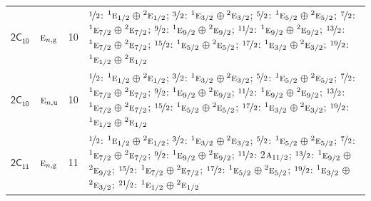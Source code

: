 \documentclass[10pt,a4paper]{article}
\numberwithin{equation}{section}
\newcommand{\grp}[1]{\mathsf{#1}}
\newcommand{\irr}[1]{\text{\normalfont\scshape #1}}
\newcommand{\conjpair}[1]{{}^{#1}}
\newcommand{\ptag}[1]{\mathrm{#1}}
\newlength{\fillwidth}\newlength{\cellwidth}\newlength{\colwidth}
\begin{document}
{\begin{longtable}{@{}llr>{\RaggedRight\arraybackslash}p{\fillwidth}@{}}
\href{2C10.pdf}{$\grp{2C_{10}}$} & $\irr{e}_{n,\ptag{g}}$ & 10 & $\nicefrac{1}{2}$: $\conjpair{1}\irr{e}_{1/2}$${}\oplus{}$$\conjpair{2}\irr{e}_{1/2}$; $\nicefrac{3}{2}$: $\conjpair{1}\irr{e}_{3/2}$${}\oplus{}$$\conjpair{2}\irr{e}_{3/2}$; $\nicefrac{5}{2}$: $\conjpair{1}\irr{e}_{5/2}$${}\oplus{}$$\conjpair{2}\irr{e}_{5/2}$; $\nicefrac{7}{2}$: $\conjpair{1}\irr{e}_{7/2}$${}\oplus{}$$\conjpair{2}\irr{e}_{7/2}$; $\nicefrac{9}{2}$: $\conjpair{1}\irr{e}_{9/2}$${}\oplus{}$$\conjpair{2}\irr{e}_{9/2}$; $\nicefrac{11}{2}$: $\conjpair{1}\irr{e}_{9/2}$${}\oplus{}$$\conjpair{2}\irr{e}_{9/2}$; $\nicefrac{13}{2}$: $\conjpair{1}\irr{e}_{7/2}$${}\oplus{}$$\conjpair{2}\irr{e}_{7/2}$; $\nicefrac{15}{2}$: $\conjpair{1}\irr{e}_{5/2}$${}\oplus{}$$\conjpair{2}\irr{e}_{5/2}$; $\nicefrac{17}{2}$: $\conjpair{1}\irr{e}_{3/2}$${}\oplus{}$$\conjpair{2}\irr{e}_{3/2}$; $\nicefrac{19}{2}$: $\conjpair{1}\irr{e}_{1/2}$${}\oplus{}$$\conjpair{2}\irr{e}_{1/2}$\\
\href{2C10.pdf}{$\grp{2C_{10}}$} & $\irr{e}_{n,\ptag{u}}$ & 10 & $\nicefrac{1}{2}$: $\conjpair{1}\irr{e}_{1/2}$${}\oplus{}$$\conjpair{2}\irr{e}_{1/2}$; $\nicefrac{3}{2}$: $\conjpair{1}\irr{e}_{3/2}$${}\oplus{}$$\conjpair{2}\irr{e}_{3/2}$; $\nicefrac{5}{2}$: $\conjpair{1}\irr{e}_{5/2}$${}\oplus{}$$\conjpair{2}\irr{e}_{5/2}$; $\nicefrac{7}{2}$: $\conjpair{1}\irr{e}_{7/2}$${}\oplus{}$$\conjpair{2}\irr{e}_{7/2}$; $\nicefrac{9}{2}$: $\conjpair{1}\irr{e}_{9/2}$${}\oplus{}$$\conjpair{2}\irr{e}_{9/2}$; $\nicefrac{11}{2}$: $\conjpair{1}\irr{e}_{9/2}$${}\oplus{}$$\conjpair{2}\irr{e}_{9/2}$; $\nicefrac{13}{2}$: $\conjpair{1}\irr{e}_{7/2}$${}\oplus{}$$\conjpair{2}\irr{e}_{7/2}$; $\nicefrac{15}{2}$: $\conjpair{1}\irr{e}_{5/2}$${}\oplus{}$$\conjpair{2}\irr{e}_{5/2}$; $\nicefrac{17}{2}$: $\conjpair{1}\irr{e}_{3/2}$${}\oplus{}$$\conjpair{2}\irr{e}_{3/2}$; $\nicefrac{19}{2}$: $\conjpair{1}\irr{e}_{1/2}$${}\oplus{}$$\conjpair{2}\irr{e}_{1/2}$\\
\href{2C11.pdf}{$\grp{2C_{11}}$} & $\irr{e}_{n,\ptag{g}}$ & 11 & $\nicefrac{1}{2}$: $\conjpair{1}\irr{e}_{1/2}$${}\oplus{}$$\conjpair{2}\irr{e}_{1/2}$; $\nicefrac{3}{2}$: $\conjpair{1}\irr{e}_{3/2}$${}\oplus{}$$\conjpair{2}\irr{e}_{3/2}$; $\nicefrac{5}{2}$: $\conjpair{1}\irr{e}_{5/2}$${}\oplus{}$$\conjpair{2}\irr{e}_{5/2}$; $\nicefrac{7}{2}$: $\conjpair{1}\irr{e}_{7/2}$${}\oplus{}$$\conjpair{2}\irr{e}_{7/2}$; $\nicefrac{9}{2}$: $\conjpair{1}\irr{e}_{9/2}$${}\oplus{}$$\conjpair{2}\irr{e}_{9/2}$; $\nicefrac{11}{2}$: 2$\irr{a}_{11/2}$; $\nicefrac{13}{2}$: $\conjpair{1}\irr{e}_{9/2}$${}\oplus{}$$\conjpair{2}\irr{e}_{9/2}$; $\nicefrac{15}{2}$: $\conjpair{1}\irr{e}_{7/2}$${}\oplus{}$$\conjpair{2}\irr{e}_{7/2}$; $\nicefrac{17}{2}$: $\conjpair{1}\irr{e}_{5/2}$${}\oplus{}$$\conjpair{2}\irr{e}_{5/2}$; $\nicefrac{19}{2}$: $\conjpair{1}\irr{e}_{3/2}$${}\oplus{}$$\conjpair{2}\irr{e}_{3/2}$; $\nicefrac{21}{2}$: $\conjpair{1}\irr{e}_{1/2}$${}\oplus{}$$\conjpair{2}\irr{e}_{1/2}$\\

\end{longtable}}
\end{document}

